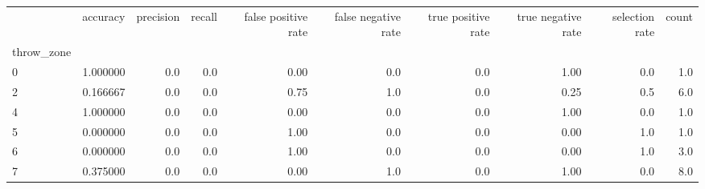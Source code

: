 \begin{tabular}{lrrrrrrrrr}
\toprule
{} &  accuracy &  precision &  recall &  false positive rate &  false negative rate &  true positive rate &  true negative rate &  selection rate &  count \\
throw\_zone &           &            &         &                      &                      &                     &                     &                 &        \\
\midrule
0          &  1.000000 &        0.0 &     0.0 &                 0.00 &                  0.0 &                 0.0 &                1.00 &             0.0 &    1.0 \\
2          &  0.166667 &        0.0 &     0.0 &                 0.75 &                  1.0 &                 0.0 &                0.25 &             0.5 &    6.0 \\
4          &  1.000000 &        0.0 &     0.0 &                 0.00 &                  0.0 &                 0.0 &                1.00 &             0.0 &    1.0 \\
5          &  0.000000 &        0.0 &     0.0 &                 1.00 &                  0.0 &                 0.0 &                0.00 &             1.0 &    1.0 \\
6          &  0.000000 &        0.0 &     0.0 &                 1.00 &                  0.0 &                 0.0 &                0.00 &             1.0 &    3.0 \\
7          &  0.375000 &        0.0 &     0.0 &                 0.00 &                  1.0 &                 0.0 &                1.00 &             0.0 &    8.0 \\
\bottomrule
\end{tabular}
